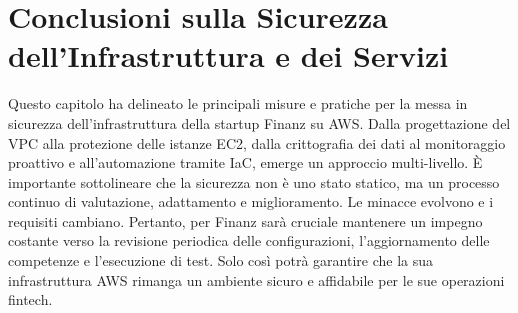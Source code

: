 \section{Conclusioni sulla Sicurezza dell'Infrastruttura e dei Servizi}
Questo capitolo ha delineato le principali misure e pratiche per la messa in sicurezza dell'infrastruttura della startup Finanz su AWS. Dalla progettazione del VPC alla protezione delle istanze EC2, dalla crittografia dei dati al monitoraggio proattivo e all'automazione tramite IaC, emerge un approccio multi-livello.
È importante sottolineare che la sicurezza non è uno stato statico, ma un processo continuo di valutazione, adattamento e miglioramento. Le minacce evolvono e i requisiti cambiano. Pertanto, per Finanz sarà cruciale mantenere un impegno costante verso la revisione periodica delle configurazioni, l'aggiornamento delle competenze e l'esecuzione di test. Solo così potrà garantire che la sua infrastruttura AWS rimanga un ambiente sicuro e affidabile per le sue operazioni fintech.
